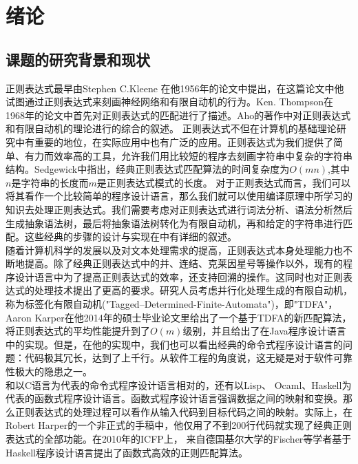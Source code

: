 \documentclass[openany,oneside]{book}
\theoremstyle{definition}
\theoremstyle{definition}
\begin{document}
\frontmatter
\sloppy %




\tableofcontents
{\xiaosi}
\clearpage{\pagestyle{empty}\cleardoublepage}

\mainmatter
{}                        %

\chapter{绪论}

	
	
\section{课题的研究背景和现状}
	正则表达式最早由Stephen C.Kleene 在他1956年的论文中提出\cite{Kleen72}，在这篇论文中他试图通过正则表达式来刻画神经网络和有限自动机的行为。Ken. Thompson在1968年的论文\cite{Thopson68}中首先对正则表达式的匹配进行了描述。Aho的著作\cite{Aho72a}中对正则表达式和有限自动机的理论进行的综合的叙述。
	正则表达式不但在计算机的基础理论研究中有重要的地位，在实际应用中也有广泛的应用。正则表达式为我们提供了简单、有力而效率高的工具，允许我们用比较短的程序去刻画字符串中复杂的字符串结构。Sedgewick\cite{Sedg92a}中指出，经典正则表达式匹配算法的时间复杂度为\(O\left( mn\right) \),其中\(n\)是字符串的长度而\(m\)是正则表达式模式的长度。
	对于正则表达式而言，我们可以将其看作一个比较简单的程序设计语言，那么我们就可以使用编译原理中所学习的知识去处理正则表达式。我们需要考虑对正则表达式进行词法分析、语法分析然后生成抽象语法树，最后将抽象语法树转化为有限自动机，再和给定的字符串进行匹配。这些经典的步骤的设计与实现在\cite{appel2004modern}中有详细的叙述。\\
	\indent 随着计算机科学的发展以及对文本处理需求的提高，正则表达式本身处理能力也不断地提高。除了经典正则表达式中的并、连结、克莱因星号等操作以外，现有的程序设计语言中为了提高正则表达式的效率，还支持回溯的操作。这同时也对正则表达式的处理技术提出了更高的要求。研究人员考虑并行化处理生成的有限自动机，称为标签化有限自动机("Tagged--Determined-Finite-Automata")，即"TDFA"，Aaron Karper\cite{karper2014efficient}在他2014年的硕士毕业论文里给出了一个基于TDFA的新匹配算法，将正则表达式的平均性能提升到了\(O\left( m\right) \)级别，并且给出了在Java程序设计语言中的实现。但是，在他的实现中，我们也可以看出经典的命令式程序设计语言的问题：代码极其冗长，达到了上千行。从软件工程的角度说，这无疑是对于软件可靠性极大的隐患之一。\\
	\indent 和以C语言为代表的命令式程序设计语言相对的，还有以Lisp、 Ocaml、Haskell为代表的函数式程序设计语言。函数式程序设计语言强调数据之间的映射和变换。那么正则表达式的处理过程可以看作从输入代码到目标代码之间的映射。实际上，在Robert Harper的一个非正式的手稿中，他仅用了不到200行代码就实现了经典正则表达式的全部功能。在2010年的ICFP上， 来自德国基尔大学的Fischer等学者基于Haskell程序设计语言提出了函数式高效的正则匹配算法\cite{fischer2010play}。
\end{document}
